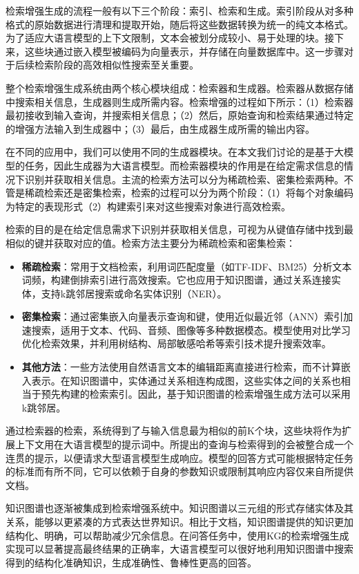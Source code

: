 检索增强生成的流程一般有以下三个阶段：索引、检索和生成。索引阶段从对多种格式的原始数据进行清理和提取开始，随后将这些数据转换为统一的纯文本格式。为了适应大语言模型的上下文限制，文本会被划分成较小、易于处理的块。接下来，这些块通过嵌入模型被编码为向量表示，并存储在向量数据库中。这一步骤对于后续检索阶段的高效相似性搜索至关重要。

整个检索增强生成系统由两个核心模块组成：检索器和生成器。检索器从数据存储中搜索相关信息，生成器则生成所需内容。检索增强的过程如下所示：（1）检索器最初接收到输入查询，并搜索相关信息；（2）然后，原始查询和检索结果通过特定的增强方法输入到生成器中；（3）最后，由生成器生成所需的输出内容。

在不同的应用中，我们可以使用不同的生成器模块。在本文我们讨论的是基于大模型的任务，因此生成器为大语言模型。而检索器模块的作用是在给定需求信息的情况下识别并获取相关信息。主流的检索方法可以分为稀疏检索、密集检索两种。不管是稀疏检索还是密集检索，检索的过程可以分为两个阶段：（1）将每个对象编码为特定的表现形式（2）构建索引来对这些搜索对象进行高效检索。

检索的目的是在给定信息需求下识别并获取相关信息，可视为从键值存储中找到最相似的键并获取对应的值。检索方法主要分为稀疏检索和密集检索：

\begin{itemize}
    \item \textbf{稀疏检索}：常用于文档检索，利用词匹配度量（如TF-IDF、BM25）分析文本词频，构建倒排索引进行高效搜索。它也应用于知识图谱，通过关系连接实体，支持k跳邻居搜索或命名实体识别（NER）。
    \item \textbf{密集检索}：通过密集嵌入向量表示查询和键，使用近似最近邻（ANN）索引加速搜索，适用于文本、代码、音频、图像等多种数据模态。模型使用对比学习优化检索效果，并利用树结构、局部敏感哈希等索引技术提升搜索效率。
    \item \textbf{其他方法}：一些方法使用自然语言文本的编辑距离直接进行检索，而不计算嵌入表示。在知识图谱中，实体通过关系相连构成图，这些实体之间的关系也相当于预先构建的检索索引。因此，基于知识图谱的检索增强生成方法可以采用k跳邻居\cite{Ye2021, Shu2022}。
\end{itemize}

通过检索器的检索，系统得到了与输入信息最为相似的前K个块，这些块将作为扩展上下文用在大语言模型的提示词中。所提出的查询与检索得到的会被整合成一个连贯的提示，以便请求大型语言模型生成响应。模型的回答方式可能根据特定任务的标准而有所不同，它可以依赖于自身的参数知识或限制其响应内容仅来自所提供文档。

知识图谱也逐渐被集成到检索增强系统中。知识图谱以三元组的形式存储实体及其关系，能够以更紧凑的方式表达世界知识。相比于文档，知识图谱提供的知识更加结构化、明确，可以帮助减少冗余信息。在问答任务中，使用KG的检索增强生成实现可以显著提高最终结果的正确率，大语言模型可以很好地利用知识图谱中搜索得到的结构化准确知识，生成准确性、鲁棒性更高的回答。

